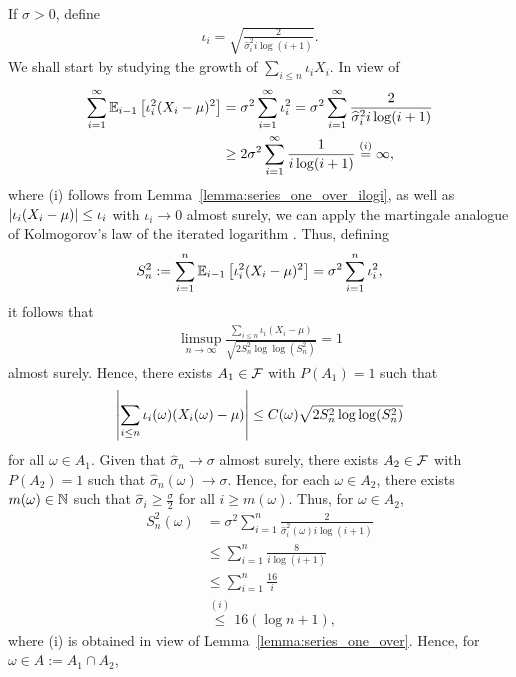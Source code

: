 If $\sigma>0$, define
\begin{align*}
    \iota_i = \sqrt{\frac{2}{\widehat\sigma_i^2 i \log(i + 1)}}.
\end{align*}
We shall start by studying the growth of $\sum_{i\leq n} \iota_i X_i$. In view of
\begin{align*}
    \sum_{i = 1}^\infty \mathbb{E}_{i-1}\left[ \iota_i^2(X_i - \mu)^2 \right] &= \sigma^2 \sum_{i = 1}^\infty \iota_i^2 =  \sigma^2 \sum_{i = 1}^\infty \frac{2}{\widehat\sigma_i^2 i \log(i + 1)} 
    \\&\geq  2\sigma^2 \sum_{i = 1}^\infty \frac{1}{ i \log(i + 1)} \stackrel{(i)}{=} \infty,
\end{align*}
where (i) follows from Lemma~\ref{lemma:series_one_over_ilogi}, as well as $\left| \iota_i (X_i - \mu) \right| \leq \iota_i$ with $\iota_i \to 0$ almost surely, we can apply the martingale analogue of Kolmogorov's law of the iterated logarithm \citep{stout1970martingale}. Thus, defining
\begin{align*}
    S_n^2 := \sum_{i = 1}^n \mathbb{E}_{i-1}\left[ \iota_i^2(X_i - \mu)^2 \right]  = \sigma^2 \sum_{i = 1}^n \iota_i^2,
\end{align*}
it follows that
\begin{align*}
    \limsup_{n \to \infty} \frac{\sum_{i \leq n} \iota_i (X_i - \mu)}{\sqrt{2 S_n^2 \log\log (S_n^2)}} = 1
\end{align*}
almost surely. Hence, there exists $A_1 \in \mathcal{F}$ with $P(A_1) = 1$ such that
\begin{align*}
     \left| \sum_{i \leq n} \iota_i(\omega) (X_i(\omega) - \mu) \right| \leq C(\omega) \sqrt{2 S_n^2 \log\log (S_n^2)}
\end{align*}
for all $\omega \in A_1$. Given that $\widehat\sigma_n \to \sigma$ almost surely, there exists $A_2 \in \mathcal{F}$ with $P(A_2) = 1$ such that $\widehat\sigma_n(\omega) \to \sigma$. Hence, for each $\omega \in A_2$, there exists $m(\omega)\in\mathbb{N}$ such that $\widehat\sigma_i \geq \frac{\sigma}{2}$ for all $i \geq m(\omega)$. Thus, for $\omega \in A_2$,
\begin{align*}
    S_n^2(\omega) &= \sigma^2 \sum_{i = 1}^n \frac{2}{\widehat\sigma_i^2(\omega) i \log(i + 1)}
    \\&\leq \sum_{i = 1}^n \frac{8}{ i \log(i + 1)}
    \\&\leq \sum_{i = 1}^n \frac{16}{i}
    \\&\stackrel{(i)}{\leq} 16(\log n + 1),
\end{align*}
 where (i) is obtained in view of Lemma~\ref{lemma:series_one_over}. Hence, for $\omega \in A:= A_1 \cap A_2$,
